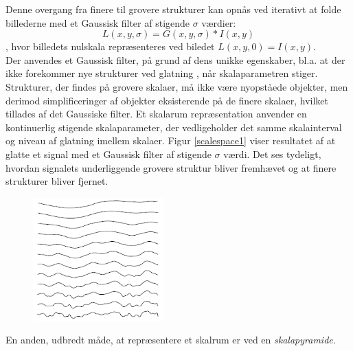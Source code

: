Denne overgang fra finere til grovere strukturer kan opnås ved iterativt at folde billederne med et Gaussisk filter af stigende $\sigma$ værdier:
\begin{equation}
L(x,y,\sigma) = G(x,y,\sigma)\ast I(x,y)
\label{scalespace1}
\end{equation}
, hvor billedets nulskala repræsenteres ved biledet $ L(x,y,0) = I(x,y)$. \\
Der anvendes et Gaussisk filter, på grund af dens unikke egenskaber,  bl.a. at der ikke forekommer nye strukturer ved glatning \cite{witkins}, når skalaparametren stiger. Strukturer, der findes på grovere skalaer, må ikke være nyopståede objekter, men derimod simplificeringer af objekter eksisterende på de finere skalaer, hvilket tillades af det Gaussiske filter. Et skalarum repræsentation anvender en kontinuerlig stigende skalaparameter, der vedligeholder det samme skalainterval og niveau af glatning imellem skalaer.
Figur \ref{scalespace1} viser resultatet af at glatte et signal med et Gaussisk filter af stigende $\sigma$ værdi. Det ses tydeligt, hvordan signalets underliggende grovere struktur bliver fremhævet og at finere strukturer bliver fjernet.
\begin{figure}[H]
    \centering
    \includegraphics[width=0.45\textwidth]{fig/33.png}
     \vspace{-1em}
    \begin{center}    
       \caption{\textcolor{gray}{\footnotesize \textit{ }}}
    \label{fig:scalereps}
     \end{center}
     \vspace{-2.5em}
  \end{figure} \noindent
En anden, udbredt måde, at repræsentere et skalrum er ved en \textit{skalapyramide}.  